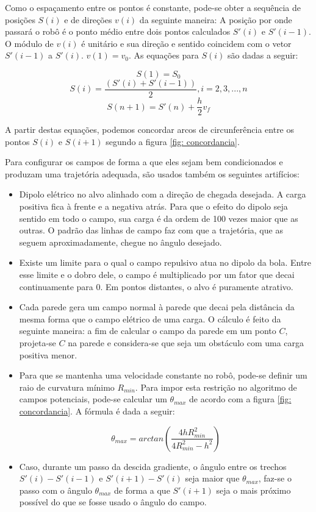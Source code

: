 \documentclass[a4paper,12pt]{article}
\begin{document}
Como o espaçamento entre os pontos é constante, pode-se obter a sequência de posições $S(i)$ e de direções $v(i)$ da seguinte maneira: A posição por onde passará o robô é o ponto médio entre dois pontos calculados $S'(i)$ e $S'(i-1)$. O módulo de $v(i)$ é unitário e sua direção e sentido coincidem com o vetor $S'(i-1)$ a $S'(i)$. $v(1) = v_{0}$. As equações para $S(i)$ são dadas a seguir:

\begin{equation}
	S(1) = S_{0}
\end{equation}
\begin{equation}
	S(i) = \frac{(S'(i)+S'(i-1))}{2}, i = 2,3,...,n
\end{equation}
\begin{equation}
	S(n+1) = S'(n) + \frac{h}{2} v_{f}
\end{equation}

A partir destas equações, podemos concordar arcos de circunferência entre os pontos $S(i)$ e $S(i+1)$ segundo a figura \ref{fig: concordancia}.

Para configurar os campos de forma a que eles sejam bem condicionados e produzam uma trajetória adequada, são usados também os seguintes artifícios:

\begin{itemize}
\item Dipolo elétrico no alvo alinhado com a direção de chegada desejada. A carga positiva fica à frente e a negativa atrás. Para que o efeito do dipolo seja sentido em todo o campo, sua carga é da ordem de 100 vezes maior que as outras. O padrão das linhas de campo faz com que a trajetória, que as seguem aproximadamente, chegue no ângulo desejado.
\item Existe um limite para o qual o campo repulsivo atua no dipolo da bola. Entre esse limite e o dobro dele, o campo é multiplicado por um fator que decai continuamente para 0. Em pontos distantes, o alvo é puramente atrativo.
\item Cada parede gera um campo normal à parede que decai pela distância da mesma forma que o campo elétrico de uma carga. O cálculo é feito da seguinte maneira: a fim de calcular o campo da parede em um ponto $C$, projeta-se $C$ na parede e considera-se que seja um obstáculo com uma carga positiva menor.
\item Para que se mantenha uma velocidade constante no robô, pode-se definir um raio de curvatura mínimo $R_{min}$. Para impor esta restrição no algoritmo de campos potenciais, pode-se calcular um $\theta_{max}$ de acordo com a figura \ref{fig: concordancia}. A fórmula é dada a seguir:

\begin{equation}
\theta_{max} = arctan(\frac{4hR_{min}^2}{4R_{min}^2 - h^2})
\end{equation}

\item Caso, durante um passo da descida gradiente, o ângulo entre os trechos $S'(i) - S'(i-1)$ e $S'(i+1) - S'(i)$ seja maior que $\theta_{max}$, faz-se o passo com o ângulo $\theta_{max}$ de forma a que $S'(i+1)$ seja o mais próximo possível do que se fosse usado o ângulo do campo.
\end{itemize}
\end{document}
